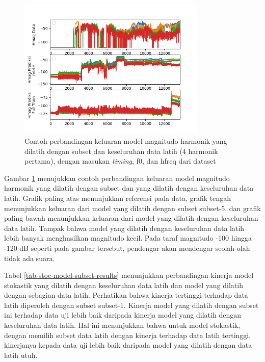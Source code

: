 \begin{figure}[htbp]
    \centering
    \includegraphics[width=0.8\textwidth]{resources/Analisis_Hmag_subset.png}
    \caption{Contoh perbandingan keluaran model magnitudo harmonik yang dilatih dengan subset dan keseluruhan data latih (4 harmonik pertama), dengan masukan \textit{timing}, f0, dan hfreq dari dataset}\label{fig-hmag-subset-output-sample}
\end{figure}

Gambar \ref{fig-hmag-subset-output-sample} menujukkan contoh perbandingan keluaran model magnitudo harmonik yang dilatih dengan subset dan yang dilatih dengan keseluruhan data latih. Grafik paling atas menunjukkan referensi pada data, grafik tengah menunjukkan keluaran dari model yang dilatih dengan subset subset-5, dan grafik paling bawah menunjukkan keluaran dari model yang dilatih dengan keseluruhan data latih. Tampak bahwa model yang dilatih dengan keseluruhan data latih lebih banyak menghasilkan magnitudo kecil. Pada taraf magnitudo -100 hingga -120 dB seperti pada gambar tersebut, pendengar akan mendengar seolah-olah tidak ada suara.

Tabel \ref{tab-stoc-model-subset-results} menunjukkan perbandingan kinerja model stokastik yang dilatih dengan keseluruhan data latih dan model yang dilatih dengan sebagian data latih. Perhatikan bahwa kinerja tertinggi terhadap data latih diperoleh dengan subset subset-1. Kinerja model yang dilatih dengan subset ini terhadap data uji lebih baik daripada kinerja model yang dilatih dengan keseluruhan data latih. Hal ini menunjukkan bahwa untuk model stokastik, dengan memilih subset data latih dengan kinerja terhadap data latih tertinggi, kinerjanya kepada data uji lebih baik daripada model yang dilatih dengan data latih utuh. 

